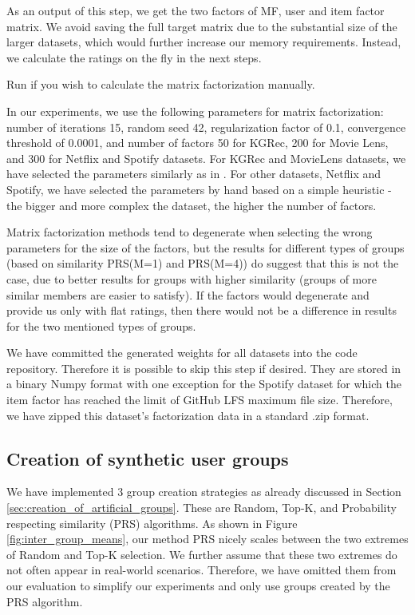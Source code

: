         As an output of this step, we get the two factors of MF, user and item factor matrix. We avoid saving the full target matrix due to the substantial size of the larger datasets, which would further increase our memory requirements. Instead, we calculate the ratings on the fly in the next steps.

        Run  if you wish to calculate the matrix factorization manually.

        In our experiments, we use the following parameters for matrix factorization: number of iterations 15, random seed 42, regularization factor of 0.1, convergence threshold of 0.0001, and number of factors 50 for KGRec, 200 for Movie Lens, and 300 for Netflix and Spotify datasets. For KGRec and MovieLens datasets, we have selected the parameters similarly as in \cite{GFAR-kaya2020}. For other datasets, Netflix and Spotify, we have selected the parameters by hand based on a simple heuristic - the bigger and more complex the dataset, the higher the number of factors.
        
        Matrix factorization methods tend to degenerate when selecting the wrong parameters for the size of the factors, but the results for different types of groups (based on similarity PRS(M=1) and PRS(M=4)) do suggest that this is not the case, due to better results for groups with higher similarity (groups of more similar members are easier to satisfy). If the factors would degenerate and provide us only with flat ratings, then there would not be a difference in results for the two mentioned types of groups.

        We have committed the generated weights for all datasets into the code repository. Therefore it is possible to skip this step if desired. They are stored in a binary Numpy format with one exception for the Spotify dataset for which the item factor has reached the limit of GitHub LFS maximum file size. Therefore, we have zipped this dataset's factorization data in a standard .zip format.
        
    \subsection{Creation of synthetic user groups}
        We have implemented 3 group creation strategies as already discussed in Section \ref{sec:creation_of_artificial_groups}. These are Random, Top-K, and Probability respecting similarity (PRS) algorithms. As shown in Figure \ref{fig:inter_group_means}, our method PRS nicely scales between the two extremes of Random and Top-K selection. We further assume that these two extremes do not often appear in real-world scenarios. Therefore, we have omitted them from our evaluation to simplify our experiments and only use groups created by the PRS algorithm.

